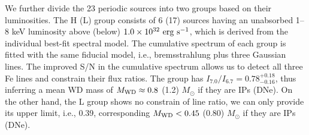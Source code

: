 \documentclass[fleqn,usenatbib]{mnras}
\begin{document}
We further divide the 23 periodic sources into two groups based on their luminosities. The H (L) group consists of 6 (17) sources having an unabsorbed 1--8 keV luminosity above (below) $\rm 1.0\times10^{32}~erg ~s^{-1}$, which is derived from the individual best-fit spectral model. 
The cumulative spectrum of each group is fitted with the same fiducial model, i.e., bremsstrahlung plus three Gaussian lines. The improved S/N in the cumulative spectrum allows us to detect all three Fe lines and constrain their flux ratios.  
The group has $I_{7.0}/I_{6.7} = 0.78^{+0.18}_{-0.16}$, thus inferring a mean WD mass of $M_{\rm WD} \approx 0.8$ (1.2) $M_\odot$ if they are IPs (DNe). 
On the other hand, the L group shows no constrain of line ratio, we can only provide its upper limit, i.e., 0.39, corresponding $M_{\rm WD} < 0.45$ (0.80) $M_\odot$ if they are IPs (DNe). 
\end{document}
